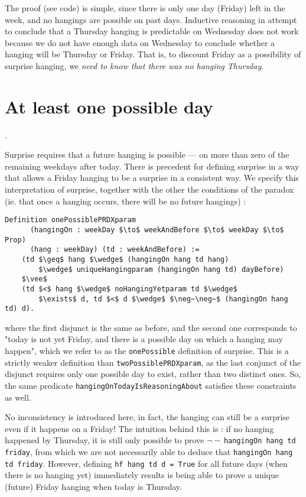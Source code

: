 \documentclass[runningheads]{llncs}
\begin{document}
The proof (see code) is simple, since there is only one day (Friday) left in the week,
and no hangings are possible on past days.
Inductive reasoning in attempt to conclude that a Thursday hanging is
predictable on Wednesday does not work because we do not have enough data on Wednesday
to conclude whether a hanging will be Thursday or Friday. That is, to discount Friday
as a possibility of surprise hanging, we \emph{need to know that there was no
hanging Thursday}.

\section{At least one possible day}.
\label{sec:one}

Surprise requires that a future hanging is possible --- on more than zero
of the remaining weekdays after today. There is precedent \cite{fourpossible}
for defining surprise
in a way that allows a Friday hanging to be a surprise in a consistent way.
We specify this interpretation of surprise, together with the other the conditions
of the paradox (ie. that once a hanging occurs, there will be no future hangings) :

\begin{lstlisting}[mathescape=true]
  Definition onePossiblePRDXparam
      (hangingOn : weekDay $\to$ weekAndBefore $\to$ weekDay $\to$ Prop)
      (hang : weekDay) (td : weekAndBefore) :=
    (td $\geq$ hang $\wedge$ (hangingOn hang td hang)
        $\wedge$ uniqueHangingparam (hangingOn hang td) dayBefore)
    $\vee$
    (td $<$ hang $\wedge$ noHangingYetparam td $\wedge$
        $\exists$ d, td $<$ d $\wedge$ $\neg~\neg~$ (hangingOn hang td) d).
\end{lstlisting}

where the first disjunct is the same as before, and
the second one corresponds to "today is not
  yet Friday, and there is a possible day on which a hanging may happen", which
  we refer to as the {\tt onePossible} definition of surprise. This is a strictly
weaker definition than {\tt twoPossiblePRDXparam}, as the last conjunct of the
disjunct requires only one possible day to exist, rather than two distinct ones.
So, the same predicate {\tt hangingOnTodayIsReasoningAbout} satisfies these
constraints as well.

No inconsistency is introduced here, in fact, the hanging can still be a surprise even if it
happens on a Friday! The intuition behind this is : if no hanging happened by
Thursday, it is still only possible to prove {\tt $\neg~\neg$~hangingOn hang td friday},
from which we are not necessarily able to deduce that {\tt hangingOn hang td friday}.
However, defining {\tt hf hang td d = True} for all future days (when there is no hanging yet)
immediately results is being able to prove a unique (future) Friday hanging when today is Thursday.
\end{document}
